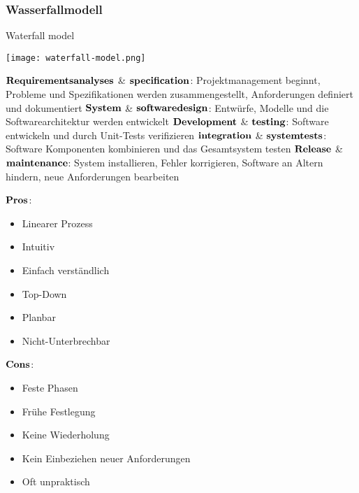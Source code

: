 \subsubsection{Wasserfallmodell}
\begin{table}[H]
\caption{Waterfall model}
\texttt{[image: waterfall-model.png]}
\end{table}
$\bold{Requirements analyses}$ \& $\bold{specification}$: Projektmanagement beginnt, Probleme und Spezifikationen werden zusammengestellt, Anforderungen definiert und dokumentiert \newline
$\bold{System}$ \& $\bold{software design}$: Entwürfe, Modelle und die Softwarearchitektur werden entwickelt \newline
$\bold{Development}$ \& $\bold{testing}$: Software entwickeln und durch Unit-Tests verifizieren \newline
$\bold{integration}$ \& $\bold{system tests}$: Software Komponenten kombinieren und das Gesamtsystem testen \newline
$\bold{Release}$ \& $\bold{maintenance}$: System installieren, Fehler korrigieren, Software an Altern hindern, neue Anforderungen bearbeiten 
\begin{multicols}{2}
$\bold{Pros}$:
\begin{itemize}
	\item Linearer Prozess
	\item Intuitiv
	\item Einfach verständlich
	\item Top-Down
	\item Planbar
	\item Nicht-Unterbrechbar
\end{itemize}
\columnbreak
$\bold{Cons}$:
\begin{itemize}
	\item Feste Phasen
	\item Frühe Festlegung
	\item Keine Wiederholung
	\item Kein Einbeziehen neuer Anforderungen
	\item Oft unpraktisch
\end{itemize}
\end{multicols}
